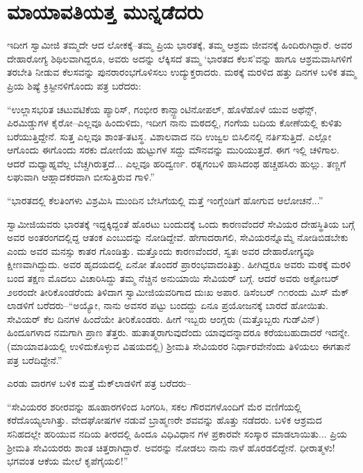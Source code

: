 
\chapter{ಮಾಯಾವತಿಯತ್ತ ಮುನ್ನಡೆದರು}

\noindent

ಇದೀಗ ಸ್ವಾಮೀಜಿ ತಮ್ಮದೇ ಆದ ಲೋಕಕ್ಕೆ–ತಮ್ಮ ಪ್ರಿಯ ಭಾರತಕ್ಕೆ, ತಮ್ಮ ಆಶ್ರಮ ಜೀವನಕ್ಕೆ ಹಿಂದಿರುಗಿದ್ದಾರೆ. ಅವರ ದೇಹಾರೋಗ್ಯ ಶಿಥಿಲವಾಗಿದ್ದರೂ, ಅವರು ಅದನ್ನು ಲೆಕ್ಕಿಸದೆ ತಮ್ಮ ‘ಭಾರತದ ಕೆಲಸ’ವನ್ನು ಹಾಗೂ ಆಶ್ರಮವಾಸಿಗಳಿಗೆ ತರಬೇತಿ ನೀಡುವ ಕೆಲಸವನ್ನು ಪುನರಾರಂಭಗೊಳಿಸಲು ಉದ್ಯುಕ್ತರಾದರು. ಮಠಕ್ಕೆ ಮರಳಿದ ಹತ್ತು ದಿನಗಳ ಬಳಿಕ ತಮ್ಮ ಪ್ರಿಯ ಶಿಷ್ಯೆ ಕ್ರಿಸ್ಟೀನಳಿಗೊಂದು ಪತ್ರ ಬರೆದರು:

“ಉಲ್ಲಾಸಭರಿತ ಚಟುವಟಿಕೆಯ ಪ್ಯಾರಿಸ್, ಗಂಭೀರ ಕಾನ್ಸ್ಟಾಂಟಿನೋಪಲ್, ಹೊಳೆಹೊಳೆ ಯುವ ಅಥೆನ್ಸ್, ಪಿರಮಿಡ್ಡುಗಳ ಕೈರೋ–ಎಲ್ಲವೂ ಹಿಂದುಳಿದು, ಇದೀಗ ನಾನು ಮಠದಲ್ಲಿ, ಗಂಗೆಯ ಬದಿಯ ಕೋಣೆಯಲ್ಲಿ ಕುಳಿತು ಬರೆಯುತ್ತಿದ್ದೇನೆ. ಸುತ್ತ ಎಲ್ಲವೂ ಶಾಂತ-ತಟಸ್ಥ. ವಿಶಾಲವಾದ ನದಿ ಉಜ್ವಲ ಬಿಸಿಲಿನಲ್ಲಿ ನರ್ತಿಸುತ್ತಿದೆ. ಎಲ್ಲೋ ಆಗೊಂದು ಈಗೊಂದು ಸರಕು ದೋಣಿಯ ಹುಟ್ಟುಗಳ ಸದ್ದು ಮೌನವನ್ನು ಮುರಿಯುತ್ತದೆ. ಈಗ ಇಲ್ಲಿ ಚಳಿಗಾಲ. ಆದರೆ ಮಧ್ಯಾಹ್ನವೆಲ್ಲ ಬೆಚ್ಚಗಿರುತ್ತದೆ... ಎಲ್ಲವೂ ಹರಿದ್ವರ್ಣ. ರತ್ನಗಂಬಳಿ ಹಾಸಿದಂಥ ಹಚ್ಚಹಸಿರು ಹುಲ್ಲು. ತಣ್ಣಗೆ ಲಘುವಾಗಿ ಆಹ್ಲಾದಕರವಾಗಿ ಬೀಸುತ್ತಿರುವ ಗಾಳಿ.”

“ಭಾರತದಲ್ಲಿ ಕೆಲತಿಂಗಳು ವಿಶ್ರಮಿಸಿ ಮುಂದಿನ ಬೇಸಿಗೆಯಲ್ಲಿ ಮತ್ತೆ ಇಂಗ್ಲೆಂಡಿಗೆ ಹೋಗುವ ಆಲೋಚನೆ...”

ಸ್ವಾಮೀಜಿಯವರು ಭಾರತಕ್ಕೆ ಇದ್ದಕ್ಕಿದ್ದಂತೆ ಹೊರಟು ಬಂದುದಕ್ಕೆ ಒಂದು ಕಾರಣವೆಂದರೆ ಸೇವಿಯರ ದೇಹಸ್ಥಿತಿಯ ಬಗ್ಗೆ ಅವರ ಅಂತರಂಗದಲ್ಲಿದ್ದ ಆತಂಕ ಎಂಬುದನ್ನು ನೋಡಿದ್ದೇವೆ. ಹೇಗಾದರಾಗಲಿ, ಸೇವಿಯರನ್ನೊಮ್ಮೆ ನೋಡಿಬಿಡಬೇಕು ಎಂದು ಅವರ ಮನಸ್ಸು ಕಾತರ ಗೊಂಡಿತ್ತು. ಮತ್ತೊಂದು ಕಾರಣವೆಂದರೆ, ಸ್ವತಃ ಅವರ ದೇಹಾರೋಗ್ಯವೂ ಕ್ಷೀಣವಾಗಿದ್ದುದು. ಅವರ ಹೃದಯದಲ್ಲಿ ಏನೋ ತೊಂದರೆ ಪ್ರಾರಂಭವಾದಂತಿತ್ತು. ಹೀಗಿದ್ದರೂ ಅವರು ಮಠಕ್ಕೆ ಮರಳಿ ಬಂದ ತಕ್ಷಣ ಮೊದಲು ವಿಚಾರಿಸಿದ್ದು ತಮ್ಮ ನೆಚ್ಚಿನ ಅನುಯಾಯಿ ಸೇವಿಯರ್ ಬಗ್ಗೆ. ಆದರೆ ಅವರು ಅಕ್ಟೋಬರ್ ೨೮ರಂದೇ ತೀರಿಕೊಂಡರೆಂದು ತಿಳಿದಾಗ ಸ್ವಾಮೀಜಿಯವರಿಗಾದ ದುಃಖ ಅಪಾರ. ಡಿಸೆಂಬರ್ ೧೧ರಂದು ಮಿಸ್ ಮೆಕ್​ಲಾಡಳಿಗೆ ಬರೆದರು–“ಅಯ್ಯೋ, ನಾನು ಅವಸರ ಪಟ್ಟು ಬಂದದ್ದು ಏನೂ ಪ್ರಯೋಜನಕ್ಕೆ ಬಾರದೆ ಹೋಯಿತು. ಸೇವಿಯರ್ ಕೆಲ ದಿನಗಳ ಹಿಂದೆಯೇ ತೀರಿಕೊಂಡರು. ಹೀಗೆ ಇಬ್ಬರು ಆಂಗ್ಲರು (ಮತ್ತೊಬ್ಬರು ಗುಡ್​ವಿನ್​) ಹಿಂದೂಗಳಾದ ನಮಗಾಗಿ ಪ್ರಾಣ ತೆತ್ತರು. ಹುತಾತ್ಮರಾಗುವುದೆಂದು ಯಾವುದನ್ನಾದರೂ ಕರೆಯಬಹುದಾದರೆ ಇದನ್ನೇ. (ಮಾಯಾವತಿಯಲ್ಲಿ ಉಳಿದುಕೊಳ್ಳುವ ವಿಷಯದಲ್ಲಿ) ಶ್ರೀಮತಿ ಸೇವಿಯರರ ನಿರ್ಧಾರವೇನೆಂದು ತಿಳಿಯಲು ಈಗತಾನೆ ಪತ್ರ ಬರೆದಿದ್ದೇನೆ.”

ಎರಡು ವಾರಗಳ ಬಳಿಕ ಮತ್ತೆ ಮೆಕ್​ಲಾಡಳಿಗೆ ಪತ್ರ ಬರೆದರು–

“ಸೇವಿಯರರ ಶರೀರವನ್ನು ಹೂಹಾರಗಳಿಂದ ಸಿಂಗರಿಸಿ, ಸಕಲ ಗೌರವಗಳೊಂದಿಗೆ ಮೆರ ವಣಿಗೆಯಲ್ಲಿ ಕರೆದೊಯ್ಯಲಾಗಿತ್ತು. ವೇದಘೋಷಗಳ ನಡುವೆ ಬ್ರಾಹ್ಮಣರೇ ಶವವನ್ನು ಹೊತ್ತು ನಡೆದರು. ಬಳಿಕ ಆಶ್ರಮದ ಸನಿಹದಲ್ಲೇ ಹರಿಯುವ ನದಿಯ ತೀರದಲ್ಲಿ ಹಿಂದೂ ವಿಧಿವಿಧಾನ ಗಳ ಪ್ರಕಾರವೇ ಸಂಸ್ಕಾರ ಮಾಡಲಾಯಿತು... ಪ್ರಿಯ ಶ್ರೀಮತಿ ಸೇವಿಯರರು ಶಾಂತ ಚಿತ್ತರಾಗಿದ್ದಾರೆ. ಅವರನ್ನು ನೋಡಲು ನಾನು ನಾಳೆ ಹೊರಡಲಿದ್ದೇನೆ. ಧೀರಾತ್ಮಳು! ಭಗವಂತ ಆಕೆಯ ಮೇಲೆ ಕೃಪೆಗೈಯಲಿ!”

